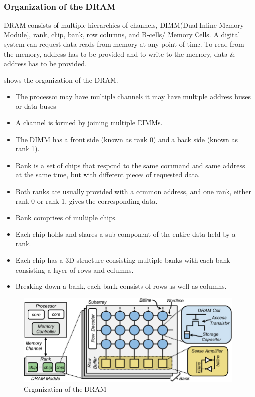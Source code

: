 \subsubsection{Organization of the DRAM}
DRAM consists of multiple hierarchies of channels, DIMM(Dual Inline Memory Module), rank, chip, bank, row columns, and B-cells/ Memory Cells. A digital system can request data reads from memory at any point of time. To read from the memory, address has to be provided and to write to the memory, data \& address has to be provided. 

 shows the organization of the DRAM.

\begin{itemize}
    \item The processor may have multiple channels \ie it may have multiple address buses or data buses. 
    \item A channel is formed by joining multiple DIMMs.
    \item The DIMM has a front side (known as rank 0) and a back side (known as rank 1).
    \item Rank is a set of chips that respond to the same command and same address at the same time, but with different pieces of requested data. 
    \item Both ranks are usually provided with a common address, and one rank, either rank 0 or rank 1, gives the corresponding data.
    \item Rank comprises of multiple chips.
    \item Each chip holds and shares a sub component of the entire data held by a rank.
    \item Each chip has a 3D structure consisting multiple banks with each bank consisting a layer of rows and columns. 
    \item Breaking down a bank, each bank consists of rows as well as columns.
\end{itemize}

\begin{figure}[H]
	\begin{center}
		\includegraphics[width=\textwidth]{images/DRAMOrganization.png}
		\caption{Organization of the DRAM}
		\label{DRAMOrganization}
	\end{center}
\end{figure}

